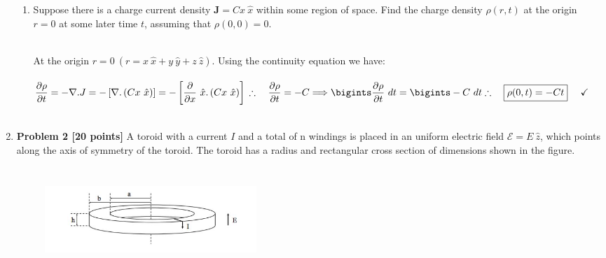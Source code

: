 \documentclass[fleqn]{article}
\begin{document}
\begin{enumerate}
\begin{enumerate}
      \item Suppose there is a charge current density $\mathbf{J}=Cx ~ \hat{x}$ within some region of space. Find the
      charge density $\rho(r, t)$ at the origin $r=0$ at some later time $t$, assuming that $\rho(0, 0)=0$.

        \textcolor{hwColor}{
          \\
          At the origin $r=0 ~ (r=x ~ \hat{x}+y ~ \hat{y}+z ~ \hat{z})$. Using the continuity equation we have:
          \\
          \\
          $
            \dfrac{\partial \rho}{\partial t}=-\nabla.J=-\left[\nabla. \left(Cx ~ \hat{x}\right)\right]
            =-\left[\dfrac{\partial}{\partial x} ~ \hat{x}. \left(Cx ~ \hat{x}\right)\right]
            \\
            \\
            \\
            \therefore ~~~ \dfrac{\partial \rho}{\partial t}=-C 
            \Longrightarrow \bigints \dfrac{\partial \rho}{\partial t} ~ dt
            =\bigints -C ~ dt
            \\
            \\
            \\
            \therefore ~~~ \boxed{
              \rho(0,t)=-Ct 
            } ~~~~ \checkmark
          $
          \\
          \\
        }
      
    \end{enumerate}


    \item \textbf{Problem 2 [20 points]} A toroid with a current $I$ and a total of n windings is placed in an uniform
    electric field $\mathcal{E}=E ~ \hat{z}$, which points along the axis of symmetry of the toroid. The toroid has a radius
    and rectangular cross section of dimensions shown in the figure.

      \begin{figure}[h!]
        \centering
        \includegraphics[height=4cm, width=8cm]{One.JPG}
      \end{figure}


\end{enumerate}
\end{document}

